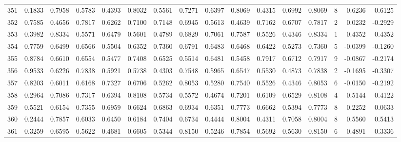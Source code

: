 \begin{tabular}{lrrrrrrrrrrrrrrr}
351 &      0.1833 &  0.7958 &  0.5783 &  0.4393 &  0.8032 &  0.5561 &  0.7271 &  0.6397 &  0.8069 &  0.4315 &   0.6992 &     0.8069 &      8 &                    0.6236 &                     0.6125 \\
352 &      0.7585 &  0.4656 &  0.7817 &  0.6262 &  0.7100 &  0.7148 &  0.6945 &  0.5613 &  0.4639 &  0.7162 &   0.6707 &     0.7817 &      2 &                    0.0232 &                    -0.2929 \\
353 &      0.3982 &  0.8334 &  0.5571 &  0.6479 &  0.5601 &  0.4789 &  0.6829 &  0.7061 &  0.7587 &  0.5526 &   0.4346 &     0.8334 &      1 &                    0.4352 &                     0.4352 \\
354 &      0.7759 &  0.6499 &  0.6566 &  0.5504 &  0.6352 &  0.7360 &  0.6791 &  0.6483 &  0.6468 &  0.6422 &   0.5273 &     0.7360 &      5 &                   -0.0399 &                    -0.1260 \\
355 &      0.8784 &  0.6610 &  0.6554 &  0.5477 &  0.7408 &  0.6525 &  0.5514 &  0.6481 &  0.5458 &  0.7917 &   0.6712 &     0.7917 &      9 &                   -0.0867 &                    -0.2174 \\
356 &      0.9533 &  0.6226 &  0.7838 &  0.5921 &  0.5738 &  0.4303 &  0.7548 &  0.5965 &  0.6547 &  0.5530 &   0.4873 &     0.7838 &      2 &                   -0.1695 &                    -0.3307 \\
357 &      0.8203 &  0.6011 &  0.6168 &  0.7327 &  0.6706 &  0.5262 &  0.8053 &  0.5280 &  0.7540 &  0.5526 &   0.4346 &     0.8053 &      6 &                   -0.0150 &                    -0.2192 \\
358 &      0.2964 &  0.7086 &  0.7317 &  0.6394 &  0.8108 &  0.5734 &  0.5572 &  0.4674 &  0.7201 &  0.6109 &   0.6529 &     0.8108 &      4 &                    0.5144 &                     0.4122 \\
359 &      0.5521 &  0.6154 &  0.7355 &  0.6959 &  0.6624 &  0.6863 &  0.6934 &  0.6351 &  0.7773 &  0.6662 &   0.5394 &     0.7773 &      8 &                    0.2252 &                     0.0633 \\
360 &      0.2444 &  0.7857 &  0.6033 &  0.6450 &  0.6184 &  0.7404 &  0.6734 &  0.4444 &  0.8004 &  0.4311 &   0.7058 &     0.8004 &      8 &                    0.5560 &                     0.5413 \\
361 &      0.3259 &  0.6595 &  0.5622 &  0.4681 &  0.6605 &  0.5344 &  0.8150 &  0.5246 &  0.7854 &  0.5692 &   0.5630 &     0.8150 &      6 &                    0.4891 &                     0.3336 \\

\end{tabular}
